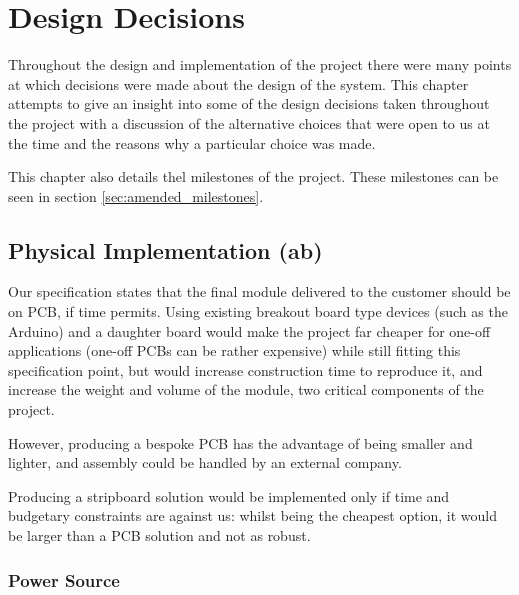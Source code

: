 \chapter{Design Decisions}
Throughout the design and implementation of the project there were many points
at which decisions were made about the design of the system. This chapter attempts
to give an insight into some of the design decisions taken throughout the project with
a discussion of the alternative choices that were open to us at the time and the reasons
why a particular choice was made.

This chapter also details thel milestones of the project. These milestones can be seen in section \ref{sec:amended_milestones}.












\section{Physical Implementation (ab)}

Our specification states that the final module delivered to the customer 
should be on PCB, if time permits. Using existing breakout board type devices 
(such as the Arduino) and a daughter board would make the project far cheaper for 
one-off applications (one-off PCBs can be rather expensive) while still fitting 
this specification point, 
but would increase construction time to reproduce it, and increase the weight 
and volume of the module, two critical components of the project.

However, producing a bespoke PCB has the advantage of being smaller 
and lighter, and assembly could be handled by an external company.

Producing a stripboard solution would be implemented only if time and budgetary constraints are against us: 
whilst being the cheapest option, it would be larger than a PCB solution and not as robust.
	
\subsection{Power Source}

